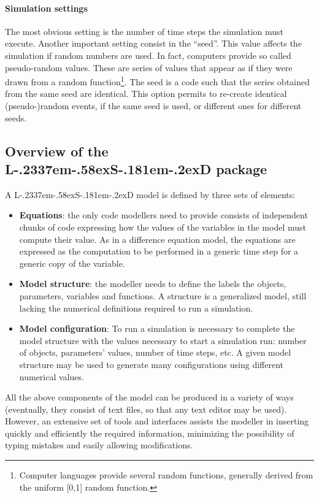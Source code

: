 \documentclass [11pt,a4paper] {book}
\def\LsD{{L\kern-.2337em\lower-.58ex\hbox{S}\kern-.181em\lower-.2ex\hbox{D}}\xspace}
\begin{document}
\paragraph{Simulation settings} The most obvious setting is the number of time steps
the simulation must execute. Another important setting consist in the ``seed''. This
value affects the simulation if random numbers are used. In fact, computers provide so
called pseudo-random values. These are series of values that appear as if they were drawn
from a random function\footnote{Computer languages provide several random functions,
generally derived from the uniform [0,1] random function.}. The seed is a code such that
the series obtained from the same seed are identical. This option permits to re-create
identical (pseudo-)random events, if the same seed is used, or different ones for different seeds.



\subsection{Overview of the \LsD package}

A \LsD model is defined by three sets of elements:

\begin{itemize}
	\item \textbf{Equations}: the only code modellers need to provide consists of independent chunks of code expressing how the values of the variables in the model must compute their value. As in a difference equation model, the equations are expressed as the computation to be performed in a generic time step for a generic copy of the variable.
	\item \textbf{Model structure}: the modeller needs to define the labels the objects, parameters, variables and functions. A structure is a generalized model, still lacking the numerical definitions required to run a simulation.
	\item \textbf{Model configuration}: To run a simulation is necessary to complete the model structure with the values necessary to start a simulation run: number of objects, parameters' values, number of time steps, etc. A given model structure may be used to generate many configurations using different numerical values.
\end{itemize}

All the above components of the model can be produced in a variety of ways (eventually, they consist of text files, so that any text editor may be used). However, an extensive set of tools and interfaces assists the modeller in inserting quickly and efficiently the required information, minimizing the possibility of typing mistakes and easily allowing modifications.
\end{document}

